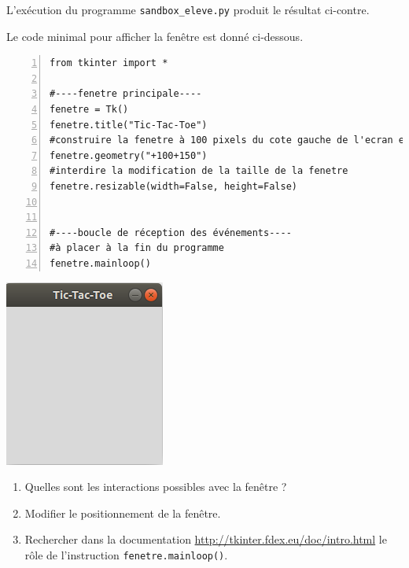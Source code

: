 \documentclass[a4paper, french, 12pt]{article}  %
\newcounter{exo}
\newcounter{exoB}
\newenvironment{exerciceB2}
{\par \bigskip  \noindent \addtocounter{exoB}{1} \hrulefill \quad { \large \textbf{Exercice \theexoB}} \quad \hrulefill \par \medskip }
{\par \bigskip }
\newcounter{act}
\begin{document}
\begin{exerciceB2}{}
\begin{minipage}{0.75\linewidth}
L'exécution du programme \verb+sandbox_eleve.py+ produit le résultat ci-contre.

Le code minimal pour afficher  la fenêtre est donné ci-dessous. 

\begin{lstlisting}[numbers=left]
from tkinter import *

#----fenetre principale----
fenetre = Tk()
fenetre.title("Tic-Tac-Toe")
#construire la fenetre à 100 pixels du cote gauche de l'ecran et 150 pixels du cote haut
fenetre.geometry("+100+150")
#interdire la modification de la taille de la fenetre
fenetre.resizable(width=False, height=False)


#----boucle de réception des événements----
#à placer à la fin du programme 
fenetre.mainloop()
\end{lstlisting}
 
\end{minipage}\hfill
\begin{minipage}{0.25\linewidth}
\begin{center}
	\includegraphics[scale=0.5]{graphiques/tictactoe.png}
\end{center}
\end{minipage}

\begin{enumerate}
	\item Quelles sont les interactions possibles avec la fenêtre ?
	\item Modifier le positionnement de la fenêtre.
	\item Rechercher dans la documentation \url{http://tkinter.fdex.eu/doc/intro.html} le rôle de l'instruction \texttt{fenetre.mainloop()}.
\end{enumerate}
\end{exerciceB2}
\end{document}
